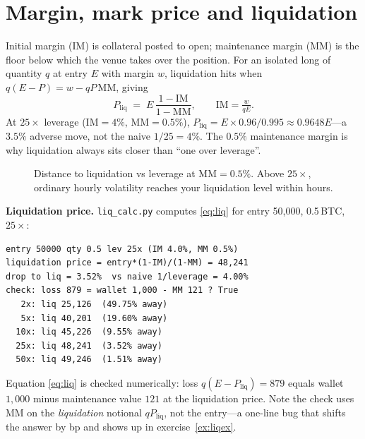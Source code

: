 \section{Margin, mark price and liquidation}\label{sec:liq}

Initial margin (IM) is collateral posted to open; maintenance margin (MM) is the floor below
which the venue takes over the position. For an isolated long of quantity $q$ at entry $E$
with margin $w$, liquidation hits when $q(E-P) = w - qP\,\mathrm{MM}$, giving
\begin{equation}\label{eq:liq}
P_{\mathrm{liq}} \;=\; E\,\frac{1-\mathrm{IM}}{1-\mathrm{MM}},
\qquad \mathrm{IM}=\tfrac{w}{qE}.
\end{equation}
At $25\times$ leverage ($\mathrm{IM}=4\%$, $\mathrm{MM}=0.5\%$), $P_{\mathrm{liq}}=E\times
0.96/0.995 \approx 0.9648E$---a $3.5\%$ adverse move, not the naive $1/25=4\%$. The $0.5\%$
maintenance margin is why liquidation always sits closer than ``one over leverage''.

\begin{figure}[htbp]\centering

\caption{Distance to liquidation vs leverage at $\mathrm{MM}=0.5\%$. Above $25\times$, ordinary
hourly volatility reaches your liquidation level within hours.}
\label{fig:liqcurve}
\end{figure}

\begin{example}\label{ex:liq}
\textbf{Liquidation price.} \texttt{liq\_calc.py} computes \eqref{eq:liq} for entry 50{,}000,
0.5\,BTC, $25\times$:
\begin{lstlisting}[numbers=none]
entry 50000 qty 0.5 lev 25x (IM 4.0%, MM 0.5%)
liquidation price = entry*(1-IM)/(1-MM) = 48,241
drop to liq = 3.52%  vs naive 1/leverage = 4.00%
check: loss 879 = wallet 1,000 - MM 121 ? True
   2x: liq 25,126  (49.75% away)
   5x: liq 40,201  (19.60% away)
  10x: liq 45,226  (9.55% away)
  25x: liq 48,241  (3.52% away)
  50x: liq 49,246  (1.51% away)
\end{lstlisting}
\begin{solution}
Equation \eqref{eq:liq} is checked numerically: loss $q(E-P_{\mathrm{liq}})=879$ equals wallet
$1{,}000$ minus maintenance value $121$ at the liquidation price. Note the check uses MM on the
\emph{liquidation} notional $qP_{\mathrm{liq}}$, not the entry---a one-line bug that shifts the
answer by bp and shows up in exercise~\ref{ex:liqex}.
\end{solution}
\end{example}

